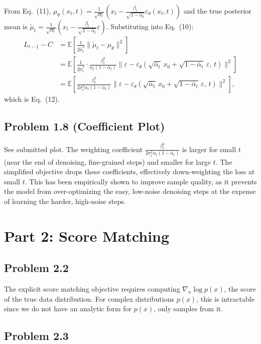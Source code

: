 \documentclass[11pt]{article}
\begin{document}
From Eq.~(11), $\mu_\theta(x_t, t) = \frac{1}{\sqrt{\alpha_t}}\left(x_t - \frac{\beta_t}{\sqrt{1-\bar\alpha_t}}\varepsilon_\theta(x_t, t)\right)$ and the true posterior mean is $\tilde\mu_t = \frac{1}{\sqrt{\alpha_t}}\left(x_t - \frac{\beta_t}{\sqrt{1-\bar\alpha_t}}\varepsilon\right)$. Substituting into Eq.~(10):
\begin{align*}
L_{t-1} - C &= \mathbb{E}\left[\frac{1}{2\tilde\sigma_t^2}\|\tilde\mu_t - \mu_\theta\|^2\right] \\
&= \mathbb{E}\left[\frac{1}{2\tilde\sigma_t^2}\cdot\frac{\beta_t^2}{\alpha_t(1-\bar\alpha_t)}\|\varepsilon - \varepsilon_\theta(\sqrt{\bar\alpha_t}\,x_0 + \sqrt{1-\bar\alpha_t}\,\varepsilon,\, t)\|^2\right] \\
&= \mathbb{E}\left[\frac{\beta_t^2}{2\sigma_t^2 \alpha_t(1-\bar\alpha_t)}\|\varepsilon - \varepsilon_\theta(\sqrt{\bar\alpha_t}\,x_0 + \sqrt{1-\bar\alpha_t}\,\varepsilon,\, t)\|^2\right],
\end{align*}
which is Eq.~(12).

\subsection*{Problem 1.8 (Coefficient Plot)}

See submitted plot. The weighting coefficient $\frac{\beta_t^2}{2\sigma_t^2 \alpha_t(1-\bar\alpha_t)}$ is larger for small $t$ (near the end of denoising, fine-grained steps) and smaller for large $t$. The simplified objective drops these coefficients, effectively down-weighting the loss at small $t$. This has been empirically shown to improve sample quality, as it prevents the model from over-optimizing the easy, low-noise denoising steps at the expense of learning the harder, high-noise steps.

\section*{Part 2: Score Matching}

\subsection*{Problem 2.2}

The explicit score matching objective requires computing $\nabla_x \log p(x)$, the score of the true data distribution. For complex distributions $p(x)$, this is intractable since we do not have an analytic form for $p(x)$, only samples from it.

\subsection*{Problem 2.3}
\end{document}
